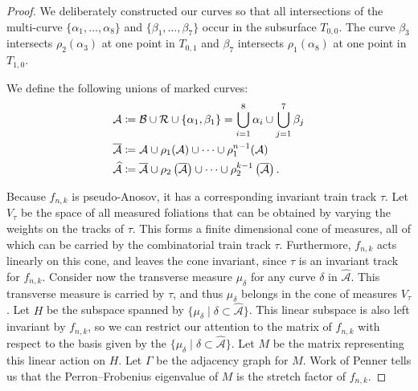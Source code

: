 \begin{proof}
 We deliberately constructed our curves so that all intersections of the multi-curve $\{\alpha_1,\dots,\alpha_8\}$ and $\{\beta_1,\dots,\beta_7\}$ occur in the subsurface $T_{0,0}$. The curve $\beta_3$ intersects $\rho_2(\alpha_3)$ at one point in $T_{0,1}$ and $\beta_7$ intersects $\rho_1(\alpha_8)$ at one point in $T_{1,0}$.

  We define the following unions of marked curves:
\begin{align*}
  \mathcal{A} &\coloneqq \mathcal{B} \cup \mathcal{R} \cup \{\alpha_1,\beta_1\} =\bigcup_{i=1}^8\alpha_i\cup\bigcup_{j=1}^7\beta_j\\
  \smallskip
  \overline{\mathcal{A}} &\coloneqq \mathcal{A} \cup \rho_1(\mathcal{A}) \cup \dots \cup \rho_1^{n-1}(\mathcal{A}) \\
  \widehat{\mathcal{A}} &\coloneqq \overline{\mathcal{A}} \cup \rho_2\left(\overline{\mathcal{A}}\right) \cup \dots \cup \rho_2^{k-1}\left(\overline{\mathcal{A}}\right).
\end{align*}

Because $f_{n,k}$ is pseudo-Anosov, it has a corresponding invariant train track $\tau$.
Let $V_{\tau}$ be the space of all measured foliations that can be obtained by varying the weights on the tracks of $\tau$.
This forms a finite dimensional cone of measures, all of which can be carried by the combinatorial train track $\tau$.
Furthermore, $f_{n,k}$ acts linearly on this cone, and leaves the cone invariant, since $\tau$ is an invariant track for $f_{n,k}$.
Consider now the transverse measure $\mu_{\delta}$ for any curve $\delta$ in $\widehat{\mathcal{A}}$.
This transverse measure is carried by $\tau$, and thus $\mu_{\delta}$ belongs in the cone of measures $V_{\tau}$.
Let $H$ be the subspace spanned by $\{\mu_\delta \mid \delta\subset\widehat{\mathcal{A}}\}$.
This linear subspace is also left invariant by $f_{n,k}$, so we can restrict our attention to the matrix of $f_{n,k}$ with respect to the basis
given by the $\{\mu_\delta \mid \delta\subset\widehat{\mathcal{A}}\}$. Let $M$
be the matrix representing this linear action on $H$.  Let $\Gamma$ be the adjacency graph for $M$. Work of Penner \cite{penner1988construction} tells us that the Perron--Frobenius eigenvalue of $M$ is the stretch factor of $f_{n,k}$.


\end{proof}
